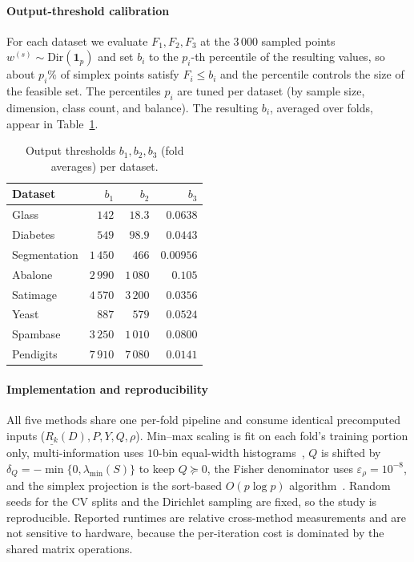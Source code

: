 \documentclass[]{interact}
\theoremstyle{plain}
\theoremstyle{definition}
\theoremstyle{remark}
\begin{document}
\paragraph*{Output-threshold calibration}
For each dataset we evaluate $F_1,F_2,F_3$ at the $3\,000$ sampled points $w^{(s)}\sim\mathrm{Dir}(\mathbf{1}_p)$ and set $b_i$ to the $p_i$-th percentile of the resulting values, so about $p_i\%$ of simplex points satisfy $F_i\le b_i$ and the percentile controls the size of the feasible set. The percentiles $p_i$ are tuned per dataset (by sample size, dimension, class count, and balance). The resulting $b_i$, averaged over folds, appear in Table~\ref{tab:thresholds}.
\begin{table}[htbp]
\centering
\caption{Output thresholds $b_1,b_2,b_3$ (fold averages) per dataset.}\label{tab:thresholds}
\begin{tabular}{lrrr}
\toprule
Dataset      & $b_1$    & $b_2$    & $b_3$     \\
\midrule
Glass        & $142$    & $18.3$   & $0.0638$  \\
Diabetes     & $549$    & $98.9$   & $0.0443$  \\
Segmentation & $1\,450$ & $466$    & $0.00956$ \\
Abalone      & $2\,990$ & $1\,080$ & $0.105$   \\
Satimage     & $4\,570$ & $3\,200$ & $0.0356$  \\
Yeast        & $887$    & $579$    & $0.0524$  \\
Spambase     & $3\,250$ & $1\,010$ & $0.0800$  \\
Pendigits    & $7\,910$ & $7\,080$ & $0.0141$  \\
\bottomrule
\end{tabular}
\end{table}

\paragraph*{Implementation and reproducibility}
All five methods share one per-fold pipeline and consume identical precomputed inputs ($\underline{R_k}(D),P,Y,Q,\rho$). Min--max scaling is fit on each fold's training portion only, multi-information uses $10$-bin equal-width histograms~\citep{brown2012}, $Q$ is shifted by $\delta_Q=-\min\{0,\lambda_{\min}(S)\}$ to keep $Q\succeq0$, the Fisher denominator uses $\varepsilon_\rho=10^{-8}$, and the simplex projection is the sort-based $O(p\log p)$ algorithm~\citep{condat2016simplex}. Random seeds for the CV splits and the Dirichlet sampling are fixed, so the study is reproducible. Reported runtimes are relative cross-method measurements and are not sensitive to hardware, because the per-iteration cost is dominated by the shared matrix operations.
\end{document}
